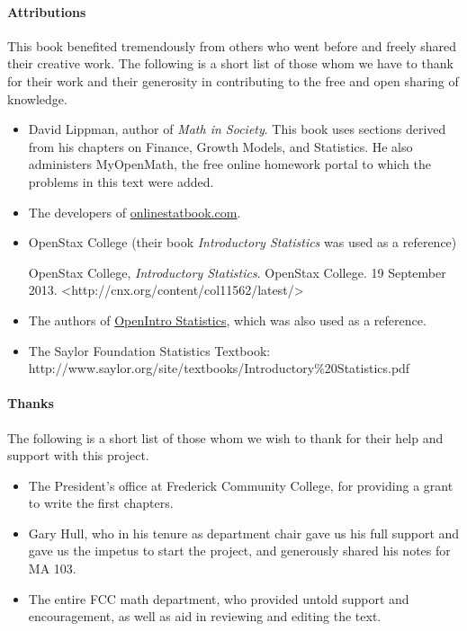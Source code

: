 \paragraph{Attributions} This book benefited tremendously from others who went before and freely shared their creative work.  The following is a short list of those whom we have to thank for their work and their generosity in contributing to the free and open sharing of knowledge.
\begin{itemize}
\item David Lippman, author of \textit{Math in Society}.  This book uses sections derived from his chapters on Finance, Growth Models, and Statistics.  He also administers MyOpenMath, the free online homework portal to which the problems in this text were added.
\item The developers of \href{onlinestatbook.com}{onlinestatbook.com}.
\item OpenStax College (their book \textit{Introductory Statistics} was used as a reference)

OpenStax College, \textit{Introductory Statistics}. OpenStax College. 19 September 2013. <http://cnx.org/content/col11562/latest/>
\item The authors of \href{https://www.openintro.org/stat/?stat_book=os}{OpenIntro Statistics}, which was also used as a reference.
\item The Saylor Foundation Statistics Textbook: http://www.saylor.org/site/textbooks/Introductory$\%$20Statistics.pdf
\end{itemize}

\paragraph{Thanks} The following is a short list of those whom we wish to thank for their help and support with this project.
\begin{itemize}
\item The President's office at Frederick Community College, for providing a grant to write the first chapters.
\item Gary Hull, who in his tenure as department chair gave us his full support and gave us the impetus to start the project, and generously shared his notes for MA 103.
\item The entire FCC math department, who provided untold support and encouragement, as well as aid in reviewing and editing the text.
\end{itemize}

